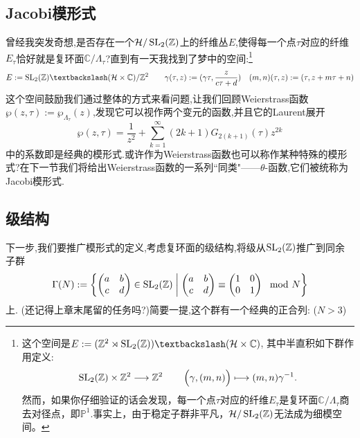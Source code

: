 \subsection{Jacobi模形式}
曾经我突发奇想,是否存在一个$\mathcal{H}/\operatorname{SL}_2(\mathbb{Z})$上的纤维丛$E$,使得每一个点$\tau$对应的纤维$E_\tau$恰好就是复环面$\mathbb{C}/\Lambda_{\tau}$?直到有一天我找到了梦中的空间:\footnote{这个空间是$E:=(\mathbb{Z}^2 \rtimes \SL_2(\mathbb{Z})) \textbackslash (\mathcal{H} \times \mathbb{C})$, 其中半直积如下群作用定义:
$$\SL_2(\mathbb{Z})  \times \mathbb{Z}^2 \longrightarrow \mathbb{Z}^2 \qquad \left( \gamma,\rule{0mm}{3.7mm} (m,n) \right) \longmapsto (m,n) \gamma^{-1} .$$
然而，如果你仔细验证的话会发现，每一个点$\tau$对应的纤维$E_\tau$是复环面$\mathbb{C}/\Lambda_{\tau}$商去对径点，即$\mathbb{P}^1$.事实上，由于稳定子群非平凡，$\mathcal{H}/\operatorname{SL}_2(\mathbb{Z})$无法成为细模空间。
}
$$E:=\SL_2(\mathbb{Z})\textbackslash (\mathcal{H} \times \mathbb{C})/\mathbb{Z}^2 \qquad \gamma(\tau,z):= (\gamma \tau,\frac{z}{c\tau +d}) \quad (m,n)(\tau,z):=(\tau, z+m\tau+n)$$
这个空间鼓励我们通过整体的方式来看问题,让我们回顾Weierstrass函数$\wp(z,\tau):= \wp_{\Lambda_{\tau}}(z)$,发现它可以视作两个变元的函数,并且它的Laurent展开
$$\wp(z,\tau)=\frac{1}{z^2}+ \sum_{k=1}^{\infty}(2k+1) G_{2(k+1)}(\tau)z^{2k}$$
中的系数即是经典的模形式.或许作为Weierstrass函数也可以称作某种特殊的模形式?在下一节我们将给出Weierstrass函数的一系列``同类"——$\theta$-函数,它们被统称为Jacobi模形式.


\subsection{级结构}
下一步,我们要推广模形式的定义,考虑复环面的级结构,将级从$\operatorname{SL}_2(\mathbb{Z})$推广到同余子群
$$\Gamma(N):=\left\{ \begin{pmatrix}
a &b \\ c & d
\end{pmatrix} \in \operatorname{SL}_2(\mathbb{Z}) \;\middle|\; \begin{pmatrix}
a &b \\ c & d
\end{pmatrix} \equiv \begin{pmatrix}
1 &0 \\ 0 & 1
\end{pmatrix} \mod N  \right\}$$
上. (还记得上章末尾留的任务吗?)简要一提,这个群有一个经典的正合列: ($N>3$)
\begin{center}
\end{center}

